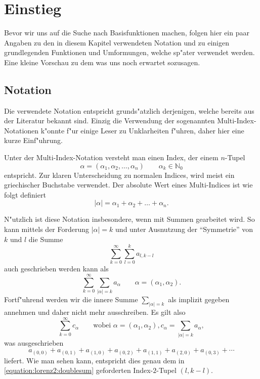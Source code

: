 \section{Einstieg\label{section:lorenz2:einstieg}}

Bevor wir uns auf die Suche nach Basisfunktionen machen, folgen hier ein paar 
Angaben zu den in diesem Kapitel verwendeten Notation und zu einigen 
grundlegenden Funktionen und Umformungen, welche sp"ater verwendet werden. Eine 
kleine Vorschau zu dem was uns noch erwartet sozusagen.

\subsection{Notation}
Die verwendete Notation entspricht grunds"atzlich derjenigen, welche 
bereits aus der Literatur bekannt sind. Einzig die Verwendung der 
sogenannten Multi-Index-Notationen k"onnte f"ur einige Leser zu Unklarheiten 
f"uhren, daher hier eine kurze Einf"uhrung.

Unter der Multi-Index-Notation versteht man einen Index, der einem 
$n$-Tupel
\begin{equation*}
	\alpha = (\alpha_1, \alpha_2, \dotsc, \alpha_n) \qquad \alpha_k \in 
	\mathbb{N}_{0}
\end{equation*}
entspricht. Zur klaren Unterscheidung zu normalen Indices, wird meist ein 
griechischer Buchstabe verwendet. Der absolute Wert eines Multi-Indices ist wie 
folgt definiert
\begin{equation*}
	|\alpha| = \alpha_1 + \alpha_2 + \dots + \alpha_n.
\end{equation*}
 
N"utzlich ist diese Notation insbesondere, wenn mit Summen gearbeitet wird. So 
kann mittels der Forderung $|\alpha| = k$ und unter Ausnutzung der 
``Symmetrie'' von $k$ und $l$ die Summe
\begin{equation}
	\sum_{k = 0}^{\infty}\sum_{l = 0}^{k}a_{l, k - l}
	\label{equation:lorenz2:doublesum}
\end{equation}
auch geschrieben werden kann als
\begin{equation*}
	\sum_{k = 0}^{\infty}\sum_{|\alpha| = k}a_{\alpha}
	\qquad \alpha = (\alpha_1, \alpha_2).
\end{equation*}
Fortf"uhrend werden wir die innere Summe $\sum_{|\alpha| = k}$ als implizit 
gegeben annehmen und daher nicht mehr ausschreiben. Es gilt also
\begin{equation*}
	\sum_{k = 0}^{\infty}c_{\alpha}
	\qquad
	\text{wobei }\alpha = (\alpha_1, \alpha_2),
	c_{\alpha} = \sum_{|\alpha| = k}a_{\alpha},
	\label{equation:lorenz2:mmsum}
\end{equation*}
was ausgeschrieben
\begin{equation*}
	a_{(0,0)} + a_{(0,1)} + a_{(1,0)} + a_{(0,2)} + a_{(1,1)} + a_{(2,0)} + 
	a_{(0,3)} + 
	\dotsb
\end{equation*}
liefert. Wie man sehen kann, entspricht dies genau dem in 
\cref{equation:lorenz2:doublesum} geforderten Index-$2$-Tupel $(l, k - l)$.

